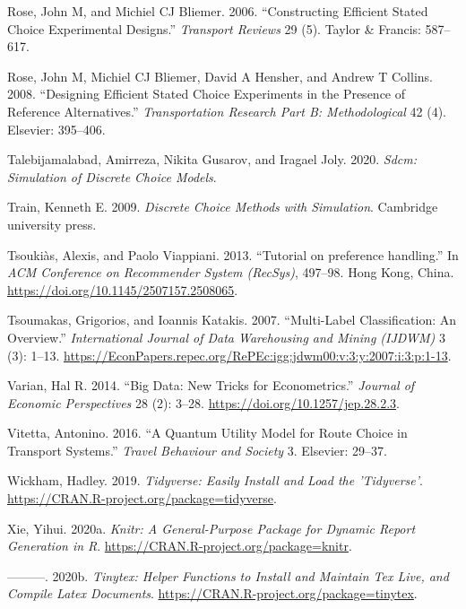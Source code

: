 \documentclass[12pt,]{article}
\begin{document}
\leavevmode\hypertarget{ref-rose2006constructing}{}%
Rose, John M, and Michiel CJ Bliemer. 2006. ``Constructing Efficient
Stated Choice Experimental Designs.'' \emph{Transport Reviews} 29 (5).
Taylor \& Francis: 587--617.

\leavevmode\hypertarget{ref-rose2008designing}{}%
Rose, John M, Michiel CJ Bliemer, David A Hensher, and Andrew T Collins.
2008. ``Designing Efficient Stated Choice Experiments in the Presence of
Reference Alternatives.'' \emph{Transportation Research Part B:
Methodological} 42 (4). Elsevier: 395--406.

\leavevmode\hypertarget{ref-R-sdcm}{}%
Talebijamalabad, Amirreza, Nikita Gusarov, and Iragael Joly. 2020.
\emph{Sdcm: Simulation of Discrete Choice Models}.

\leavevmode\hypertarget{ref-train2009dc}{}%
Train, Kenneth E. 2009. \emph{Discrete Choice Methods with Simulation}.
Cambridge university press.

\leavevmode\hypertarget{ref-tsoukias2013ph}{}%
Tsoukiàs, Alexis, and Paolo Viappiani. 2013. ``Tutorial on preference
handling.'' In \emph{ACM Conference on Recommender System (RecSys)},
497--98. Hong Kong, China.
\url{https://doi.org/10.1145/2507157.2508065}.

\leavevmode\hypertarget{ref-tsoumakas2007cm}{}%
Tsoumakas, Grigorios, and Ioannis Katakis. 2007. ``Multi-Label
Classification: An Overview.'' \emph{International Journal of Data
Warehousing and Mining (IJDWM)} 3 (3): 1--13.
\url{https://EconPapers.repec.org/RePEc:igg:jdwm00:v:3:y:2007:i:3:p:1-13}.

\leavevmode\hypertarget{ref-varian2014bd}{}%
Varian, Hal R. 2014. ``Big Data: New Tricks for Econometrics.''
\emph{Journal of Economic Perspectives} 28 (2): 3--28.
\url{https://doi.org/10.1257/jep.28.2.3}.

\leavevmode\hypertarget{ref-vitetta2016quantum}{}%
Vitetta, Antonino. 2016. ``A Quantum Utility Model for Route Choice in
Transport Systems.'' \emph{Travel Behaviour and Society} 3. Elsevier:
29--37.

\leavevmode\hypertarget{ref-R-tidyverse}{}%
Wickham, Hadley. 2019. \emph{Tidyverse: Easily Install and Load the
'Tidyverse'}. \url{https://CRAN.R-project.org/package=tidyverse}.

\leavevmode\hypertarget{ref-R-knitr}{}%
Xie, Yihui. 2020a. \emph{Knitr: A General-Purpose Package for Dynamic
Report Generation in R}. \url{https://CRAN.R-project.org/package=knitr}.

\leavevmode\hypertarget{ref-R-tinytex}{}%
---------. 2020b. \emph{Tinytex: Helper Functions to Install and
Maintain Tex Live, and Compile Latex Documents}.
\url{https://CRAN.R-project.org/package=tinytex}.
\end{document}

